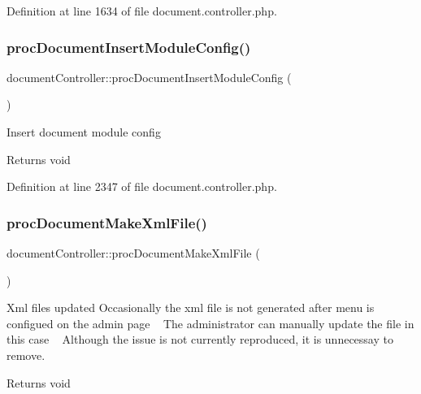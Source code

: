 Definition at line 1634 of file document.\+controller.\+php.

\mbox{\label{classdocumentController_aede408d35ea6622dfa1b39ec52f84e44}} 
\subsubsection{\texorpdfstring{proc\+Document\+Insert\+Module\+Config()}{procDocumentInsertModuleConfig()}}
{\footnotesize\ttfamily document\+Controller\+::proc\+Document\+Insert\+Module\+Config (\begin{DoxyParamCaption}{ }\end{DoxyParamCaption})}

Insert document module config \begin{DoxyReturn}{Returns}
void 
\end{DoxyReturn}


Definition at line 2347 of file document.\+controller.\+php.

\mbox{\label{classdocumentController_a749d60be23e4645a5656a82a4fae1962}} 
\subsubsection{\texorpdfstring{proc\+Document\+Make\+Xml\+File()}{procDocumentMakeXmlFile()}}
{\footnotesize\ttfamily document\+Controller\+::proc\+Document\+Make\+Xml\+File (\begin{DoxyParamCaption}{ }\end{DoxyParamCaption})}

Xml files updated Occasionally the xml file is not generated after menu is configued on the admin page ~\newline
The administrator can manually update the file in this case ~\newline
Although the issue is not currently reproduced, it is unnecessay to remove. \begin{DoxyReturn}{Returns}
void 
\end{DoxyReturn}



